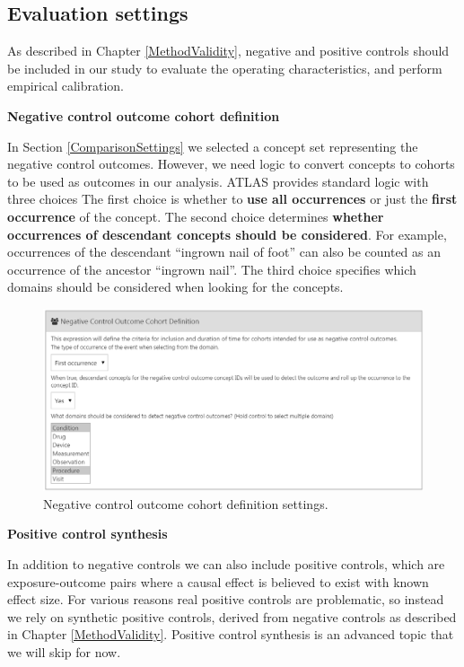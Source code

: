 \documentclass[11pt]{book}
\begin{document}
\subsection{Evaluation settings}\label{evaluationSettings}

As described in Chapter \ref{MethodValidity}, negative and positive
controls should be included in our study to evaluate the operating
characteristics, and perform empirical calibration.

\textbf{Negative control outcome cohort definition}

In Section \ref{ComparisonSettings} we selected a concept set
representing the negative control outcomes. However, we need logic to
convert concepts to cohorts to be used as outcomes in our analysis.
ATLAS provides standard logic with three choices The first choice is
whether to \textbf{use all occurrences} or just the \textbf{first
occurrence} of the concept. The second choice determines \textbf{whether
occurrences of descendant concepts should be considered}. For example,
occurrences of the descendant ``ingrown nail of foot'' can also be
counted as an occurrence of the ancestor ``ingrown nail''. The third
choice specifies which domains should be considered when looking for the
concepts.

\begin{figure}

{\centering \includegraphics[width=1\linewidth]{images/PopulationLevelEstimation/ncSettings} 

}

\caption{Negative control outcome cohort definition settings.}\label{fig:ncSettings}
\end{figure}

\textbf{Positive control synthesis}

In addition to negative controls we can also include positive controls,
which are exposure-outcome pairs where a causal effect is believed to
exist with known effect size. For various reasons real positive controls
are problematic, so instead we rely on synthetic positive controls,
derived from negative controls as described in Chapter
\ref{MethodValidity}. Positive control synthesis is an advanced topic
that we will skip for now.
\end{document}
